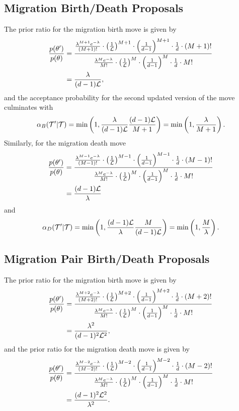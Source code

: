 \subsection{Migration Birth/Death Proposals}
The prior ratio for the migration birth move is given by
\begin{align*}
	\frac{p(\theta')}{p(\theta)} & = \frac{\frac{\lambda^{M+1} e^{-\lambda}}{(M+1)!} \cdot \left( \frac{1}{\mathcal{L}} \right)^{M+1} \cdot \left( \frac{1}{d-1} \right)^{M+1} \cdot \frac{1}{d} \cdot (M+1)!}{\frac{\lambda^M e^{-\lambda}}{M!} \cdot \left( \frac{1}{\mathcal{L}} \right)^M \cdot \left( \frac{1}{d-1} \right)^M \cdot \frac{1}{d} \cdot M!} \\
	& = \frac{\lambda}{(d-1) \mathcal{L} },
\end{align*}
and the acceptance probability for the second updated version of the move culminates with
\[
\alpha_B (\mathcal{T}' | \mathcal{T}) = \min \left(1, \frac{\lambda}{(d-1) \mathcal{L}} \frac{(d-1) \mathcal{L}}{M+1}\right) = \min \left(1, \frac{\lambda }{M+1}\right).
\]
Similarly, for the migration death move
\begin{align*}
	\frac{p(\theta')}{p(\theta)} & = \frac{\frac{\lambda^{M-1} e^{-\lambda}}{(M-1)!} \cdot \left( \frac{1}{\mathcal{L}} \right)^{M-1} \cdot \left( \frac{1}{d-1} \right)^{M-1} \cdot \frac{1}{d} \cdot (M-1)!}{\frac{\lambda^M e^{-\lambda}}{M!} \cdot \left( \frac{1}{\mathcal{L}} \right)^M \cdot \left( \frac{1}{d-1} \right)^M \cdot \frac{1}{d} \cdot M!} \\
	& = \frac{(d-1) \mathcal{L} }{\lambda}
\end{align*}
and
\[
\alpha_D (\mathcal{T}' | \mathcal{T}) = \min \left(1, \frac{(d-1) \mathcal{L}}{\lambda} \frac{M}{(d-1) \mathcal{L}} \right) = \min \left( 1, \frac{M}{\lambda} \right).
\]

\subsection{Migration Pair Birth/Death Proposals}
The prior ratio for the migration birth move is given by
\begin{align*}
	\frac{p(\theta')}{p(\theta)} & = \frac{\frac{\lambda^{M+2} e^{-\lambda}}{(M+2)!} \cdot \left( \frac{1}{\mathcal{L}} \right)^{M+2} \cdot \left( \frac{1}{d-1} \right)^{M+2} \cdot \frac{1}{d} \cdot (M+2)!}{\frac{\lambda^M e^{-\lambda}}{M!} \cdot \left( \frac{1}{\mathcal{L}} \right)^M \cdot \left( \frac{1}{d-1} \right)^M \cdot \frac{1}{d} \cdot M!} \\
	& = \frac{\lambda^2}{(d-1)^2 \mathcal{L}^2 },
\end{align*}
and the prior ratio for the migration death move is given by
\begin{align*}
	\frac{p(\theta')}{p(\theta)} & = \frac{\frac{\lambda^{M -2 } e^{-\lambda}}{(M-2)!} \cdot \left( \frac{1}{\mathcal{L}} \right)^{M - 2} \cdot \left( \frac{1}{d-1} \right)^{M-2} \cdot \frac{1}{d} \cdot (M-2)!}{\frac{\lambda^M e^{-\lambda}}{M!} \cdot \left( \frac{1}{\mathcal{L}} \right)^M \cdot \left( \frac{1}{d-1} \right)^M \cdot \frac{1}{d} \cdot M!} \\
	& = \frac{(d-1)^2 \mathcal{L}^2 }{\lambda^2}.
\end{align*}

